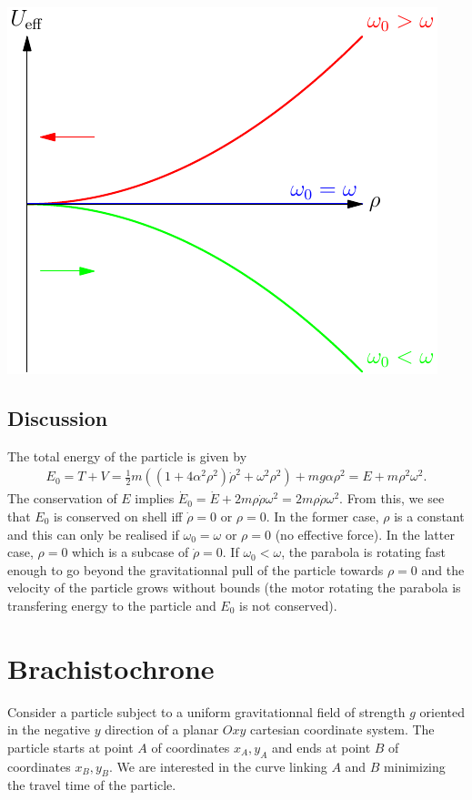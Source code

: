 \documentclass[10pt, a4paper]{article}
\begin{document}
\hfill
\begin{minipage}{0.4\textwidth}
    \includegraphics[width=\linewidth]{figures/Ueff.pdf}
\end{minipage}


\subsection{Discussion}
The total energy of the particle is given by 
\begin{align*}
E_0 = T + V = \frac{1}{2}m \left(\left(1 + 4\alpha^2 \rho^2\right) \dot{\rho}^2  + \omega^2\rho^2 \right) + mg \alpha \rho^2 = E + m\rho^2\omega^2.
\end{align*}
The conservation of $E$ implies $\dot{E}_0 = \dot{E} + 2 m \rho \dot{\rho} \omega^2 = 2 m \rho \dot{\rho} \omega^2$. From this, we see that $E_0$ is conserved on shell iff $\dot{\rho} = 0$ or $\rho = 0$. In the former case, $\rho$ is a constant and this can only be realised if $\omega_0=\omega$ or $\rho = 0$ (no effective force). In the latter case, $\rho = 0$ which is a subcase of $\dot{\rho}=0$. If $\omega_0<\omega$, the parabola is rotating fast enough to go beyond the gravitationnal pull of the particle towards $\rho=0$ and the velocity of the particle grows without bounds (the motor rotating the parabola is transfering energy to the particle and $E_0$ is not conserved). 
\pagebreak

\section{Brachistochrone}
Consider a particle subject to a uniform gravitationnal field of strength $g$ oriented in the negative $y$ direction of a planar $Oxy$ cartesian coordinate system. The particle starts at point $A$ of coordinates $x_A, y_A$ and ends at point $B$ of coordinates $x_B, y_B$. We are interested in the curve linking $A$ and $B$ minimizing the travel time of the particle. 
%
\end{document}

